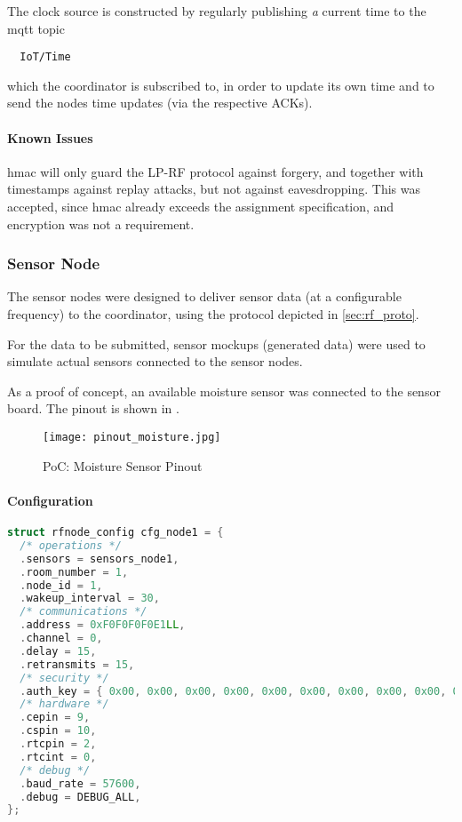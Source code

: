 The clock source is constructed by regularly publishing \emph{a} current time to the \gls{mqtt} topic
\begin{lstlisting}
  IoT/Time
\end{lstlisting}
which the coordinator is subscribed to, in order to update its own time and to send the nodes time updates (via the respective ACKs).

\paragraph{Known Issues}

\begin{compactitem}
  \item \Gls{hmac} will only guard the LP-RF protocol against forgery, and together with timestamps against replay attacks, but not against eavesdropping. This was accepted, since \gls{hmac} already exceeds the assignment specification, and encryption was not a requirement.
\end{compactitem}

\subsubsection{Sensor Node}
\label{sec:sens_node}

The sensor nodes were designed to deliver sensor data (at a configurable frequency) to the coordinator, using the protocol depicted in \cref{sec:rf_proto}.

For the data to be submitted, sensor mockups (generated data) were used to simulate actual sensors connected to the sensor nodes.

As a proof of concept, an available moisture sensor was connected to the sensor board. The pinout is shown in .

\begin{figure}[htb]
  \centering
  \texttt{[image: pinout\_moisture.jpg]}
  \caption{PoC: Moisture Sensor Pinout}
  \label{fig:sensor_pinout}
\end{figure}

\paragraph{Configuration}

\begin{lstlisting}[language=C++,label=lst:node_config,caption="Config struct for the Nodes"]
struct rfnode_config cfg_node1 = {
  /* operations */
  .sensors = sensors_node1,
  .room_number = 1,
  .node_id = 1,
  .wakeup_interval = 30,
  /* communications */
  .address = 0xF0F0F0F0E1LL,
  .channel = 0,
  .delay = 15,
  .retransmits = 15,
  /* security */
  .auth_key = { 0x00, 0x00, 0x00, 0x00, 0x00, 0x00, 0x00, 0x00, 0x00, 0x00, 0x00, 0x00, 0x00, 0x00, 0x00, 0x00 },
  /* hardware */
  .cepin = 9,
  .cspin = 10,
  .rtcpin = 2,
  .rtcint = 0,
  /* debug */
  .baud_rate = 57600,
  .debug = DEBUG_ALL,
};
\end{lstlisting}


